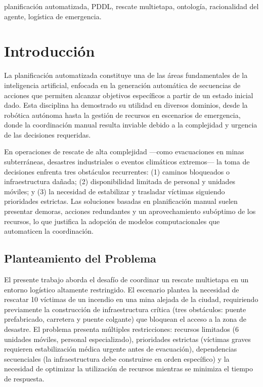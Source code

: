 \documentclass[conference]{IEEEtran}
\begin{document}
    \begin{IEEEkeywords}
    planificación automatizada, PDDL, rescate multietapa, ontología, racionalidad del agente, logística de emergencia.
    \end{IEEEkeywords}

    \section{Introducción}

    La planificación automatizada constituye una de las áreas fundamentales de la inteligencia artificial, enfocada en la generación automática de secuencias de acciones que permiten alcanzar objetivos específicos a partir de un estado inicial dado. Esta disciplina ha demostrado su utilidad en diversos dominios, desde la robótica autónoma hasta la gestión de recursos en escenarios de emergencia, donde la coordinación manual resulta inviable debido a la complejidad y urgencia de las decisiones requeridas.

    En operaciones de rescate de alta complejidad ---como evacuaciones en minas subterráneas, desastres industriales o eventos climáticos extremos--- la toma de decisiones enfrenta tres obstáculos recurrentes: (1) caminos bloqueados o infraestructura dañada; (2) disponibilidad limitada de personal y unidades móviles; y (3) la necesidad de estabilizar y trasladar víctimas siguiendo prioridades estrictas. Las soluciones basadas en planificación manual suelen presentar demoras, acciones redundantes y un aprovechamiento subóptimo de los recursos, lo que justifica la adopción de modelos computacionales que automaticen la coordinación.

    \subsection{Planteamiento del Problema}

    El presente trabajo aborda el desafío de coordinar un rescate multietapa en un entorno logístico altamente restringido. El escenario plantea la necesidad de rescatar 10 víctimas de un incendio en una mina alejada de la ciudad, requiriendo previamente la construcción de infraestructura crítica (tres obstáculos: puente prefabricado, carretera y puente colgante) que bloquean el acceso a la zona de desastre. El problema presenta múltiples restricciones: recursos limitados (6 unidades móviles, personal especializado), prioridades estrictas (víctimas graves requieren estabilización médica urgente antes de evacuación), dependencias secuenciales (la infraestructura debe construirse en orden específico) y la necesidad de optimizar la utilización de recursos mientras se minimiza el tiempo de respuesta.
\end{document}
